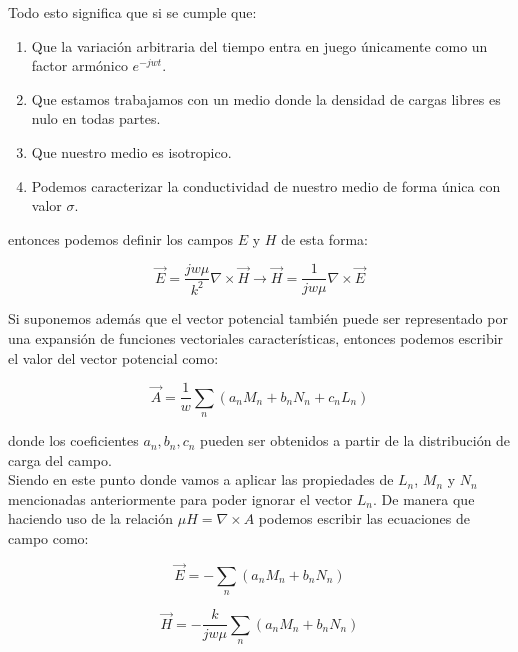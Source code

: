 \noindent
Todo esto significa que si se cumple que:
\begin{enumerate}
    \item Que la variación arbitraria del tiempo entra en juego únicamente como un factor armónico $e^{-jwt}$.
    \item Que estamos trabajamos con un medio donde la densidad de cargas libres es nulo en todas partes.
    \item   Que nuestro medio es isotropico.
    \item Podemos caracterizar la conductividad de nuestro medio de forma única con valor $\sigma$.

\end{enumerate}

\noindent
entonces podemos definir los campos $E$ y $H$ de esta forma:

\begin{equation}
\vec{E} = \frac{jw\mu}{k^2}\nabla \times \vec{H}\xrightarrow{}   \vec{H}= \frac{1}{jw\mu}\nabla \times \vec{E}
\label{campo-EyH-cumpliendo-simplificacion-con-MnyNn}
\end{equation}

Si suponemos además que el vector potencial también puede ser representado por una expansión de funciones vectoriales características, entonces podemos escribir el valor del vector potencial como:

\begin{equation}
\vec{A} = \frac{1}{w}\sum_{n}(a_{n}M_{n}+b_{n}N_{n}+c_{n}L_{n})
\label{vector-potencial-cumpliendo-simplificacion-con-MnyNn}
\end{equation}

\noindent
donde los coeficientes $a_{n}, b_{n}, c_{n}$ pueden ser obtenidos a partir de la distribución de carga del campo.\\

Siendo en este punto donde vamos a aplicar las propiedades de $L_{n}$, $M_{n}$ y $N_{n}$ mencionadas anteriormente para poder ignorar el vector $L_{n}$. De manera que haciendo uso de la relación $\mu H = \nabla \times A$ podemos escribir las ecuaciones de campo como:


    \begin{equation}
        \vec{E} = - \sum_{n}(a_{n}M_{n}+b_{n}N_{n})
    \label{eq-E general usando Mn y Nn}
    \end{equation}

    \begin{equation}
         \vec{H} = - \frac{k}{jw\mu}\sum_{n}(a_{n}M_{n}+b_{n}N_{n})
    \label{eq-H general usando Mn y Nn}
    \end{equation}  

